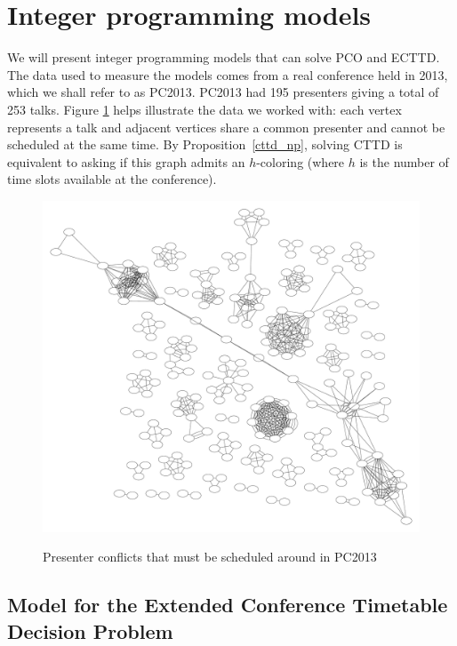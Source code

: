 \documentclass{svjour3}                     %
\begin{document}
\section{Integer programming models}\label{sec.model}

We will present integer programming models that can solve PCO and ECTTD. 
The data used to measure the models comes from a real conference held in 2013, which we shall refer to as PC2013. 
PC2013 had 195 presenters giving a total of 253 talks. 
Figure \ref{fig_pc2013_graph} helps illustrate the data we worked with: each vertex represents a talk and adjacent vertices share a common presenter and cannot be scheduled at the same time. 
By Proposition~\ref{cttd_np}, solving CTTD is equivalent to asking if this graph admits an $h$-coloring (where $h$ is the number of time slots available at the conference).
\begin{figure}[h!]
	\caption{Presenter conflicts that must be scheduled around in PC2013}
	\centering
	\includegraphics[width=\textwidth]{penguiconconflict}
	\vspace{-.5in}
	\label{fig_pc2013_graph}
\end{figure}

\subsection{Model for the Extended Conference Timetable Decision Problem}
\end{document}
